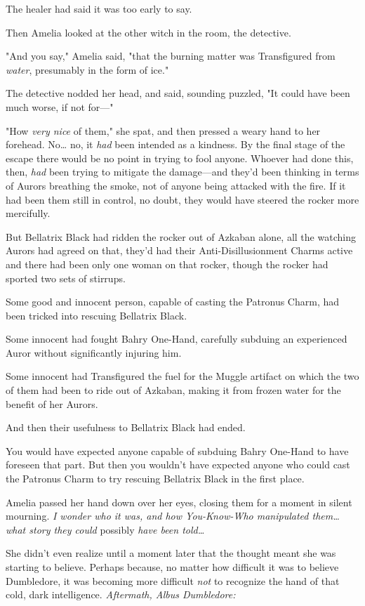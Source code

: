 The healer had said it was too early to say.

Then Amelia looked at the other witch in the room, the detective.

"And you say," Amelia said, "that the burning matter was Transfigured from 
\emph{water}, presumably in the form of ice."

The detective nodded her head, and said, sounding puzzled, "It could have been 
much worse, if not for---"

"How \emph{very nice} of them," she spat, and then pressed a weary hand to her 
forehead. No{\ldots} no, it \emph{had} been intended as a kindness. By the 
final stage of the escape there would be no point in trying to fool anyone. 
Whoever had done this, then, \emph{had} been trying to mitigate the 
damage---and they'd been thinking in terms of Aurors breathing the smoke, not 
of anyone being attacked with the fire. If it had been them still in control, 
no doubt, they would have steered the rocker more mercifully.

But Bellatrix Black had ridden the rocker out of Azkaban alone, all the 
watching Aurors had agreed on that, they'd had their Anti-Disillusionment 
Charms active and there had been only one woman on that rocker, though the 
rocker had sported two sets of stirrups.

Some good and innocent person, capable of casting the Patronus Charm, had been 
tricked into rescuing Bellatrix Black.

Some innocent had fought Bahry One-Hand, carefully subduing an experienced 
Auror without significantly injuring him.

Some innocent had Transfigured the fuel for the Muggle artifact on which the 
two of them had been to ride out of Azkaban, making it from frozen water for 
the benefit of her Aurors.

And then their usefulness to Bellatrix Black had ended.

You would have expected anyone capable of subduing Bahry One-Hand to have 
foreseen that part. But then you wouldn't have expected anyone who could cast 
the Patronus Charm to try rescuing Bellatrix Black in the first place.

Amelia passed her hand down over her eyes, closing them for a moment in silent 
mourning. \emph{I wonder who it was, and how You-Know-Who manipulated 
them{\ldots} what story they could} possibly\emph{ have been told{\ldots}}

She didn't even realize until a moment later that the thought meant she was 
starting to believe. Perhaps because, no matter how difficult it was to believe 
Dumbledore, it was becoming more difficult \emph{not} to recognize the hand of 
that cold, dark intelligence.
\sbreak
\emph{Aftermath, Albus Dumbledore:}

